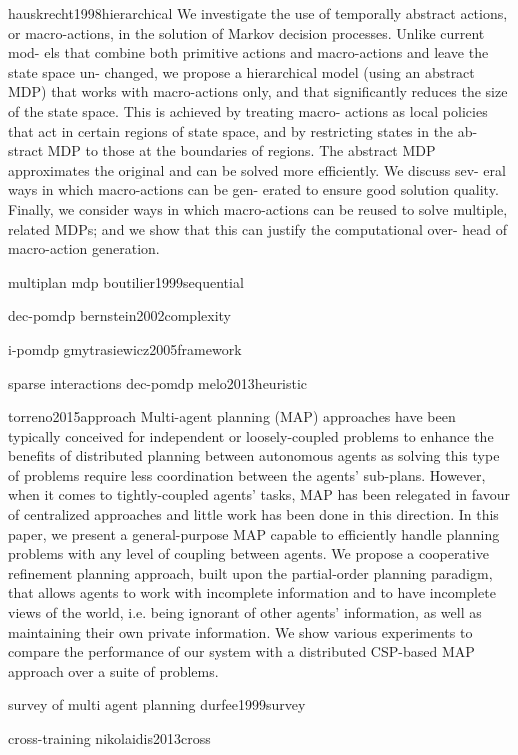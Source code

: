 hauskrecht1998hierarchical
We investigate the use of temporally abstract
actions, or macro-actions, in the solution of
Markov decision processes. Unlike current mod-
els that combine both primitive actions and
macro-actions and leave the state space un-
changed, we propose a hierarchical model (using
an abstract MDP) that works with macro-actions
only, and that significantly reduces the size of the
state space. This is achieved by treating macro-
actions as local policies that act in certain regions
of state space, and by restricting states in the ab-
stract MDP to those at the boundaries of regions.
The abstract MDP approximates the original and
can be solved more efficiently. We discuss sev-
eral ways in which macro-actions can be gen-
erated to ensure good solution quality. Finally,
we consider ways in which macro-actions can be
reused to solve multiple, related MDPs; and we
show that this can justify the computational over-
head of macro-action generation.

multiplan mdp
boutilier1999sequential

dec-pomdp
bernstein2002complexity

i-pomdp
gmytrasiewicz2005framework

sparse interactions dec-pomdp
melo2013heuristic

torreno2015approach
Multi-agent planning (MAP) approaches have been typically conceived for independent or loosely-coupled problems to enhance the benefits of distributed planning between autonomous agents as solving this type of problems require less coordination between the agents' sub-plans. However, when it comes to tightly-coupled agents' tasks, MAP has been relegated in favour of centralized approaches and little work has been done in this direction. In this paper, we present a general-purpose MAP capable to efficiently handle planning problems with any level of coupling between agents. We propose a cooperative refinement planning approach, built upon the partial-order planning paradigm, that allows agents to work with incomplete information and to have incomplete views of the world, i.e. being ignorant of other agents' information, as well as maintaining their own private information. We show various experiments to compare the performance of our system with a distributed CSP-based MAP approach over a suite of problems.

survey of multi agent planning
durfee1999survey


cross-training
nikolaidis2013cross

